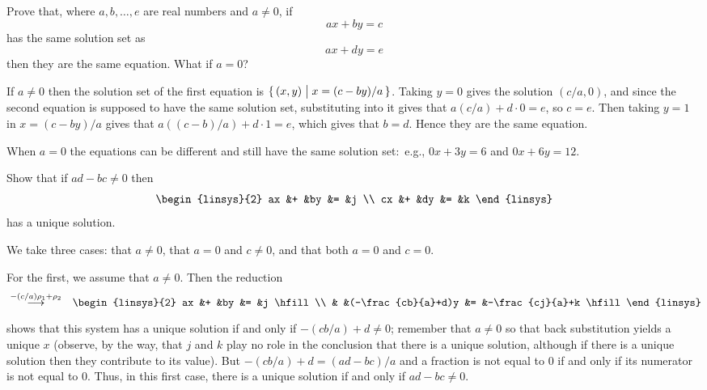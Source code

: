 \begin{exercises}
\begin{answer}
     \end{answer}
  \item 
    Prove that, where \( a,b,\ldots,e \) are real numbers
    and \( a\neq 0 \), if
    \begin{equation*}
       ax+by=c
    \end{equation*}
    has the same solution set as
    \begin{equation*}
       ax+dy=e
    \end{equation*}
    then they are the same equation.
    What if \( a=0 \)?
    \begin{answer}
      If \( a\neq 0 \) then the solution set of the first equation is
      \( \mbox{$\{\,(x,y)\bigm| x=(c-by)/a\,\}$} \).
      Taking $y=0$ gives the solution $(c/a,0)$, and since the second
      equation is supposed to have the same solution set, substituting into
      it gives that $a(c/a)+d\cdot 0=e$, so $c=e$.
      Then taking $y=1$ in $x=(c-by)/a$ gives that $a((c-b)/a)+d\cdot 1=e$,
      which gives that $b=d$.
      Hence they are the same equation.

      When \( a=0 \) the equations can be different and still have the 
      same solution set:~e.g.,
      \( 0x+3y=6 \) and \( 0x+6y=12 \).   
     \end{answer}
  \recommended \item 
    Show that if \( ad-bc\neq 0 \) then
    \begin{equation*}
      \begin{linsys}{2}
        ax  &+  &by  &=  &j  \\
        cx  &+  &dy  &=  &k  
      \end{linsys}
    \end{equation*}
    has a unique solution.
    \begin{answer}
      We take three cases: that $a\neq 0$, that $a=0$ and 
      $c\neq 0$, and that both $a=0$ and $c=0$.

      For the first, we assume that \( a\neq 0 \).
      Then the reduction
      \begin{eqnarray*}
        &\grstep{-(c/a)\rho_1+\rho_2}
        &\begin{linsys}{2}
          ax  &+  &by                  &=  &j \hfill \\
              &   &(-\frac{cb}{a}+d)y  &=  &-\frac{cj}{a}+k \hfill  
         \end{linsys}
      \end{eqnarray*}
      shows that this system has a unique solution if and only if
      \( -(cb/a)+d\neq 0   \); remember that \( a\neq 0 \) so 
      that back substitution yields a unique \( x \)
      (observe, by the way, that \( j \) and \( k \) play no role in the
      conclusion that there is a unique solution, although if there is a 
      unique solution then they contribute to its value).
      But \( -(cb/a)+d = (ad-bc)/a \) and a fraction is not equal to \( 0 \) 
      if and only if its numerator is not equal to \( 0 \).
      Thus, in this first case, there is a unique solution if and only if
      $ad-bc\neq 0$.


\end{answer}
\end{exercises}
